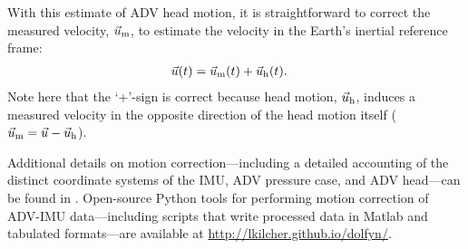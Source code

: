 With this estimate of ADV head motion, it is straightforward to correct the measured velocity, $\umeas$, to estimate the velocity in the Earth's inertial reference frame:
\begin{align}
  \label{eqn:u_mot_def}
  \ue(t) & = \umeas(t) + \uhead(t).
\end{align}
Note here that the `+'-sign is correct because head motion, $\uhead$, induces a measured velocity in the opposite direction of the head motion itself ($\umeas = \ue - \uhead$).

Additional details on motion correction---including a detailed accounting of the distinct coordinate systems of the IMU, ADV pressure case, and ADV head---can be found in \cite{Kilcher++2016}. Open-source Python tools for performing motion correction of ADV-IMU data---including scripts that write processed data in Matlab and tabulated formats---are available at \url{http://lkilcher.github.io/dolfyn/}.

\def\ue{\ensuremath{\vec{u}\earth}}

